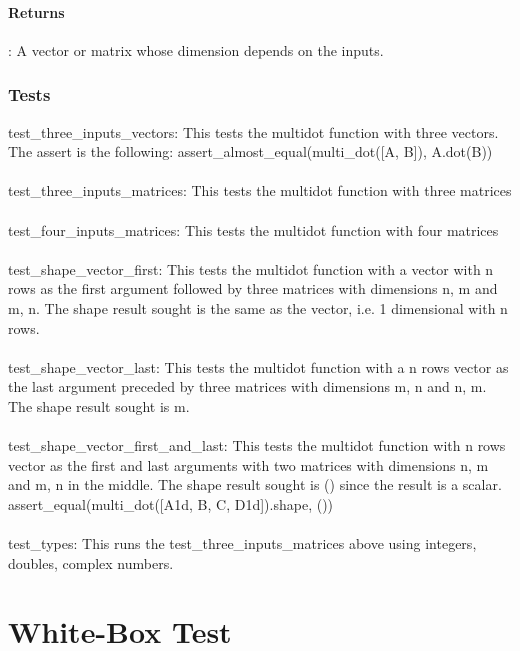 \documentclass[a4paper,11pt]{article}
\begin{document}
\paragraph{Returns}: A vector or matrix whose dimension depends on the inputs. 
\subsubsection{Tests}
test\_three\_inputs\_vectors: This tests the multidot function with three vectors. The assert is the following: assert\_almost\_equal(multi\_dot([A, B]), A.dot(B))\\
\\
test\_three\_inputs\_matrices: This tests the multidot function with three matrices\\
\\
test\_four\_inputs\_matrices: This tests the multidot function with four matrices\\
\\
test\_shape\_vector\_first: This tests the multidot function with a vector with n rows as the first argument followed by three matrices with dimensions n, m and m, n. The shape result sought is the same as the vector, i.e. 1 dimensional with n rows. \\
\\
test\_shape\_vector\_last: This tests the multidot function with a n rows vector as the last argument preceded by three matrices with dimensions m, n and n, m. The shape result sought is m. \\
\\
test\_shape\_vector\_first\_and\_last: This tests the multidot function with n rows vector as the first and last arguments with two matrices with dimensions n, m and m, n in the middle. The shape result sought is () since the result is a scalar. assert\_equal(multi\_dot([A1d, B, C, D1d]).shape, ())\\
\\
test\_types: This runs the test\_three\_inputs\_matrices above using integers, doubles, complex numbers. 


\section{White-Box Test}
\end{document}
